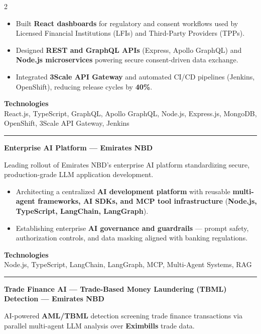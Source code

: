 \documentclass[10pt,a4paper]{article}
\newcommand{\blockdivider}{\vspace{0pt}\color{rulecolor}\rule{\linewidth}{0.5pt}\color{primary}\vspace{4pt}}
\newcommand{\projecttitle}[1]{\textbf{#1}\par\vspace{2pt}}
\begin{document}
\begin{paracol}{2}
\begin{itemize}

\item Built \textbf{React dashboards} for regulatory and consent workflows used by Licensed Financial Institutions (LFIs) and Third-Party Providers (TPPs).

\item Designed \textbf{REST and GraphQL APIs} (Express, Apollo GraphQL) and \textbf{Node.js microservices} powering secure consent-driven data exchange.

\item Integrated \textbf{3Scale API Gateway} and automated CI/CD pipelines (Jenkins, OpenShift), reducing release cycles by \textbf{40\%}.

\end{itemize}

\textbf{Technologies}\\
React.js, TypeScript, GraphQL, Apollo GraphQL, Node.js, Express.js, MongoDB, OpenShift, 3Scale API Gateway, Jenkins

\blockdivider

\projecttitle{Enterprise AI Platform — Emirates NBD}

Leading rollout of Emirates NBD's enterprise AI platform standardizing secure, production-grade LLM application development.

\begin{itemize}

\item Architecting a centralized \textbf{AI development platform} with reusable \textbf{multi-agent frameworks, AI SDKs, and MCP tool infrastructure} (\textbf{Node.js, TypeScript, LangChain, LangGraph}).

\item Establishing enterprise \textbf{AI governance and guardrails} — prompt safety, authorization controls, and data masking aligned with banking regulations.

\end{itemize}

\textbf{Technologies}\\
Node.js, TypeScript, LangChain, LangGraph, MCP, Multi-Agent Systems, RAG

\blockdivider

\projecttitle{Trade Finance AI — Trade-Based Money Laundering (TBML) Detection — Emirates NBD}

AI-powered \textbf{AML/TBML} detection screening trade finance transactions via parallel multi-agent LLM analysis over \textbf{Eximbills} trade data.


\end{paracol}
\end{document}
